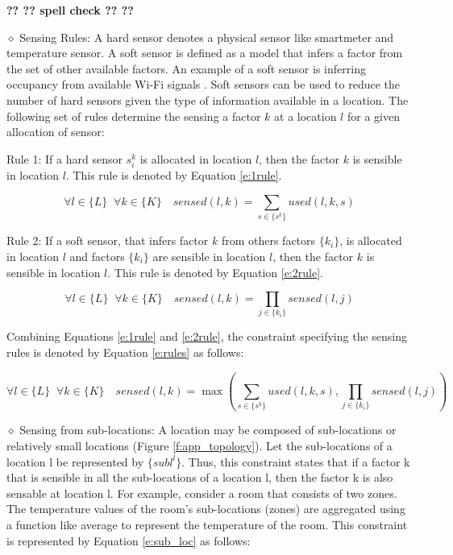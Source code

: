 \documentclass[]{interact}
\theoremstyle{plain}%
\theoremstyle{definition}
\theoremstyle{remark}
\begin{document}
\textbf{?? ?? spell check ?? ??}


\noindent $\diamond$ Sensing Rules: A hard sensor denotes a physical sensor like smartmeter and temperature sensor. 
A soft sensor is defined as a model that infers a factor from the set of other available factors. An example of a soft sensor is inferring occupancy from available Wi-Fi signals \citep{occupancy_wifi}.  
Soft sensors can be used to reduce the number of hard sensors given the type of information available in a location.  
The following set of rules determine the sensing a factor $k$ at a location $l$ for a given allocation of sensor: %

  \noindent Rule 1: If a hard sensor $s_i^k$ is allocated in location $l$, then the factor $k$ is sensible in location $l$. 
  This rule is denoted by Equation \eqref{e:1rule}.

\begin{equation}
  \label{e:1rule}
  \forall l \in \{L\} \;\; \forall k \in \{K\} \quad sensed(l,k) = 
  \sum_{s \in \{s^k\}}  used(l,k,s)  
  \end{equation}

  \noindent Rule 2: If a soft sensor, that infers factor $k$ from others factors $\{k_i\}$, is allocated in location $l$ and factors $\{k_i\}$ are sensible in location $l$, then the factor $k$ is sensible in location $l$.
  This rule is denoted by Equation \eqref{e:2rule}.

\begin{equation}
  \label{e:2rule}
  \forall l \in \{L\} \;\; \forall k \in \{K\} \quad sensed(l,k) = 
  \prod_{j \in \{k_i\}} sensed(l,j)
  \end{equation}

Combining Equations \eqref{e:1rule} and \eqref{e:2rule}, the constraint specifying the sensing rules is denoted by Equation \eqref{e:rules} as follows: 

\begin{equation}
  \label{e:rules}
  \forall l \in \{L\} \;\; \forall k \in \{K\} \quad sensed(l,k) = \max \left(
  \sum_{s \in \{s^k\}}  used(l,k,s) , 
  \prod_{j \in \{k_i\}} sensed(l,j)
  \right)
  \end{equation}

  \noindent $\diamond$ Sensing from sub-locations: A location may be composed of sub-locations or relatively small locations (Figure \ref{f:app_topology}). Let the sub-locations of a location l be represented by $\{subl^l\}$. Thus, this constraint states that if a factor k that is sensible in all the sub-locations of a location l, then the factor k is also sensable at location l. For example, consider a room that consists of two zones. 
  The temperature values of the room's sub-locations (zones) are aggregated using a function like average to represent the temperature of the room.
  This constraint is represented by Equation \eqref{e:sub_loc} as follows:
\end{document}
